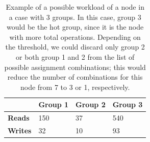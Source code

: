 \begin{table}[!htb]
  \centering
  \begin{tabular}{l l l l}
    \hline
    & \textbf{Group 1} & \textbf{Group 2} & \textbf{Group 3} \\
    \hline
    \textbf{Reads} & 150 & 37 & 540 \\
    \textbf{Writes} & 32 & 10 & 93 \\
    \hline
  \end{tabular}

  \caption{Example of a possible workload of a node in a case with 3 groups. In this case, group 3 would be the hot group, since it is the node with more total operations. Depending on the threshold, we could discard only group 2 or both group 1 and 2 from the list of possible assignment combinations; this would reduce the number of combinations for this node from 7 to 3 or 1, respectively.}\label{tab:hot-groups-example}
\end{table}

